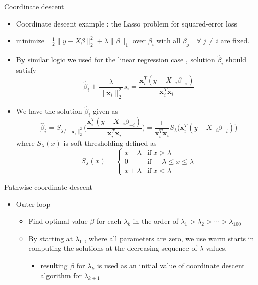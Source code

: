 \documentclass[11pt]{beamer}
\begin{document}
\begin{frame}{Coordinate descent}
    \begin{itemize}
        \item Coordinate descent example : the Lasso problem for squared-error loss
        \item $\text{minimize}\quad \frac 12 \|y-X\beta\|_2^2+\lambda\|\beta\|_1$ over $\beta_i$ with all $\beta_j\quad\forall \;j\neq i$ are fixed.
        \item By similar logic we used for the linear regression case , solution $\hat\beta_i$ should satisfy $$\hat\beta_i+\frac{\lambda}{\|\mathbf{x}_i\|_2^2}s_i=\frac{\mathbf{x}_i^T(y-X_{-i}\beta_{-i})}{\mathbf{x}_i^T\mathbf{x}_i} $$ 
        \item  We have the solution $\hat\beta_i$ given as
        $$\hat\beta_i = S_{\lambda / \|\mathbf{x}_i\|_2^2}\Big(\frac{\mathbf{x}_i^T(y-X_{-i}\beta_{-i})}{\mathbf{x}_i^T\mathbf{x}_i}\Big) = \frac{1}{\mathbf{x}_i^T\mathbf{x}_i}S_\lambda\big(\mathbf{x}_i^T(y-X_{-i}\beta_{-i})\big) $$ where $S_\lambda(x)$ is soft-thresholding defined as $$S_\lambda(x)=\begin{cases}
            x-\lambda & \text{if}\; x> \lambda \\
            0 & \text{if}\; -\lambda\leq x\leq \lambda \\
            x+\lambda & \text{if}\; x<\lambda
        \end{cases} $$
    \end{itemize}
\end{frame}

\begin{frame}{Pathwise coordinate descent}
    \begin{itemize}
        \item Outer loop
        \begin{itemize}
            \item Find optimal value $\beta$ for each $\lambda_k$ in the order of $\lambda_1>\lambda_2>\cdots > \lambda_{100}$
            \item By starting at $\lambda_1$ ,  where all parameters are zero, we use warm starts in computing the solutions at the decreasing sequence of $\lambda$ values. 
            \begin{itemize}
                \item resulting $\beta$ for $\lambda_k$ is used as an initial value of coordinate descent algorithm for $\lambda_{k+1}$ 
            \end{itemize}
        \end{itemize}
    \end{itemize}
\end{frame}
\end{document}
